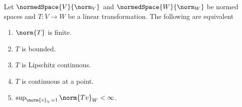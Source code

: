 \begin{theorem} \label{th:linearTransformation}
    Let \(\normedSpace{V}{\norm_V}\) and \(\normedSpace{W}{\norm_W}\) be normed spaces and \(T: V \to W\) be a linear transformation. The following are equivalent
    \begin{enumerate}
        \item \(\norm{T}\) is finite. \label{it:LT_1}
        \item \(T\) is bounded. \label{it:LT_2}
        \item \(T\) is Lipschitz continuous. \label{it:LT_3}
        \item \(T\) is continuous at a point. \label{it:LT_4}
        \item \(\sup_{\norm{v}_V = 1} \norm{Tv}_W < \infty\). \label{it:LT_5}
    \end{enumerate}
\end{theorem}

